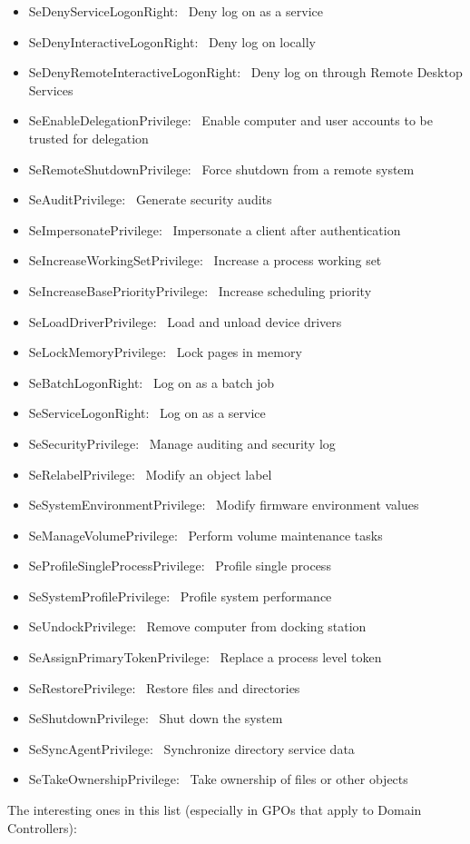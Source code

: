 \begin{itemize}
    \item SeDenyServiceLogonRight:  Deny log on as a service
    \item SeDenyInteractiveLogonRight:  Deny log on locally
    \item SeDenyRemoteInteractiveLogonRight:  Deny log on through Remote Desktop Services
    \item SeEnableDelegationPrivilege:  Enable computer and user accounts to be trusted for delegation
    \item SeRemoteShutdownPrivilege:  Force shutdown from a remote system
    \item SeAuditPrivilege:  Generate security audits
    \item SeImpersonatePrivilege:  Impersonate a client after authentication
    \item SeIncreaseWorkingSetPrivilege:  Increase a process working set
    \item SeIncreaseBasePriorityPrivilege:  Increase scheduling priority
    \item SeLoadDriverPrivilege:  Load and unload device drivers
    \item SeLockMemoryPrivilege:  Lock pages in memory
    \item SeBatchLogonRight:  Log on as a batch job
    \item SeServiceLogonRight:  Log on as a service
    \item SeSecurityPrivilege:  Manage auditing and security log
    \item SeRelabelPrivilege:  Modify an object label
    \item SeSystemEnvironmentPrivilege:  Modify firmware environment values
    \item SeManageVolumePrivilege:  Perform volume maintenance tasks
    \item SeProfileSingleProcessPrivilege:  Profile single process
    \item SeSystemProfilePrivilege:  Profile system performance
    \item SeUndockPrivilege:  Remove computer from docking station
    \item SeAssignPrimaryTokenPrivilege:  Replace a process level token
    \item SeRestorePrivilege:  Restore files and directories
    \item SeShutdownPrivilege:  Shut down the system
    \item SeSyncAgentPrivilege:  Synchronize directory service data
    \item SeTakeOwnershipPrivilege:  Take ownership of files or other objects
\end{itemize}
The interesting ones in this list (especially in GPOs that apply to Domain Controllers):

